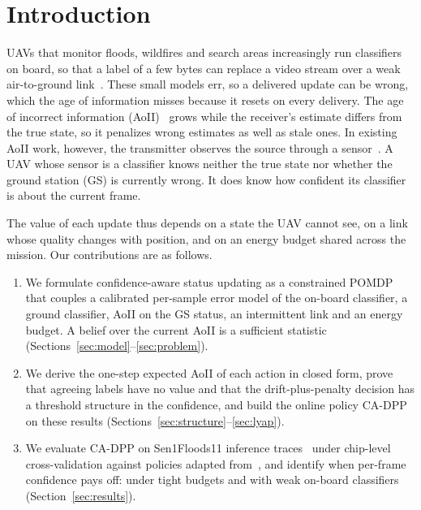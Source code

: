 \documentclass[conference]{IEEEtran}
\theoremstyle{remark}
\begin{document}
\section{Introduction}
UAVs that monitor floods, wildfires and search areas increasingly run classifiers on board, so that a label of a few bytes can replace a video stream over a weak air-to-ground link~\cite{shamsoshoara2021flame,kyrkou2020aider}. These small models err, so a delivered update can be wrong, which the age of information misses because it resets on every delivery. The age of incorrect information (AoII)~\cite{maatouk2020aoii} grows while the receiver's estimate differs from the true state, so it penalizes wrong estimates as well as stale ones. In existing AoII work, however, the transmitter observes the source through a sensor~\cite{maatouk2020aoii,zakeri2023aoiieh,ngo2025eh}. A UAV whose sensor is a classifier knows neither the true state nor whether the ground station (GS) is currently wrong. It does know how confident its classifier is about the current frame.

The value of each update thus depends on a state the UAV cannot see, on a link whose quality changes with position, and on an energy budget shared across the mission. Our contributions are as follows.
\begin{enumerate}
\item We formulate confidence-aware status updating as a constrained POMDP that couples a calibrated per-sample error model of the on-board classifier, a ground classifier, AoII on the GS status, an intermittent link and an energy budget. A belief over the current AoII is a sufficient statistic (Sections~\ref{sec:model}--\ref{sec:problem}).
\item We derive the one-step expected AoII of each action in closed form, prove that agreeing labels have no value and that the drift-plus-penalty decision has a threshold structure in the confidence, and build the online policy CA-DPP on these results (Sections~\ref{sec:structure}--\ref{sec:lyap}).
\item We evaluate CA-DPP on Sen1Floods11 inference traces~\cite{bonafilia2020sen1floods11} under chip-level cross-validation against policies adapted from~\cite{gan2025taoi,pehlivanoglu2026orbit,basnayaka2025aomi,zakeri2023aoiieh}, and identify when per-frame confidence pays off: under tight budgets and with weak on-board classifiers (Section~\ref{sec:results}).
\end{enumerate}
\end{document}
